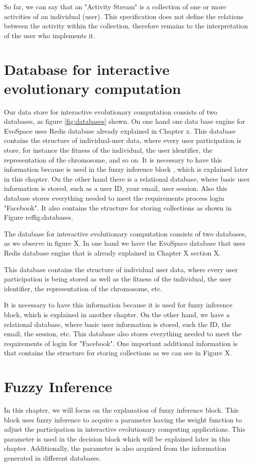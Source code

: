 So far, we can say that an "Activity Stream" is a collection of one or more activities of an individual (user).
This specification does not define the relations between the activity within the collection, therefore remains to the interpretation of the user who implements it.

\section{Database for interactive evolutionary computation}
Our data store for interactive evolutionary computation consists of two databases, as figure \ref{fig:databases} shown. On one hand one  data base  engine for EvoSpace uses Redis database already explained in Chapter x.  This database contains the structure of individual-user data, where every user participation is store, for instance the fitness of the individual, the  user identifier, the representation of the chromosome, and so on. It is necessary to have this information because is used in the fuzzy inference block , which is explained later in this chapter. 
On the other hand there is a relational database, where basic user information is stored, such as a user ID, your email, user session. Also this database  stores everything needed to meet the requirements process login "Facebook". It also contains the structure for storing collections as shown in Figure ref{fig:databases}.





The database for interactive evolutionary computation consists of two databases, as we observe in figure X. In one hand we have the EvoSpace database that uses Redis database engine that is already explained in Chapter X section X.

This database contains the structure of individual user data, where every user participation is being stored as well as the fitness of the individual, the user identifier, the representation of the chromosome, etc. 

It is necessary to have this information because it is used for fuzzy inference block, which is explained in another chapter. On the other hand, we have a relational database, where basic user information is stored, such the ID, the email, the session, etc. This database also stores everything needed to meet the requirements of login for "Facebook". One important additional information is that contains the structure for storing collections as we can see in Figure X.

\section{Fuzzy Inference}
In this chapter, we will focus on the explanation of fuzzy inference block. This block uses fuzzy inference to acquire a parameter having the weight function to adjust the participation in interactive evolutionary computing applications. This parameter is used in the decision block which will be explained later in this chapter. Additionally, the parameter is also acquired from the information generated in different databases.

